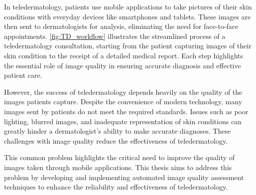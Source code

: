 \noindent
In teledermatology, patients use mobile applications to take pictures of their skin conditions with everyday devices like smartphones and tablets. These images are then sent to dermatologists for analysis, eliminating the need for face-to-face appointments. \autoref{fig:TD_workflow} illustrates the streamlined process of a teledermatology consultation, starting from the patient capturing images of their skin condition to the receipt of a detailed medical report. Each step highlights the essential role of image quality in ensuring accurate diagnosis and effective patient care. \par
\vspace{\baselineskip}
\noindent
However, the success of teledermatology depends heavily on the quality of the images patients capture. Despite the convenience of modern technology, many images sent by patients do not meet the required standards. Issues such as poor lighting, blurred images, and inadequate representation of skin conditions can greatly hinder a dermatologist’s ability to make accurate diagnoses. These challenges with image quality reduce the effectiveness of teledermatology. \par
\vspace{\baselineskip}
\noindent
This common problem highlights the critical need to improve the quality of images taken through mobile applications. This thesis aims to address this problem by developing and implementing automated image quality assessment techniques to enhance the reliability and effectiveness of teledermatology. \par 


